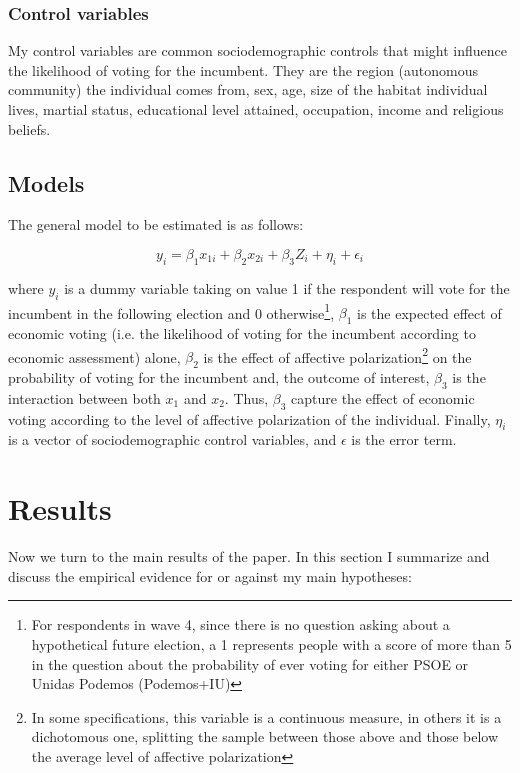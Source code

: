 \documentclass[a4paper, svgnames]{article}
\begin{document}
\subsubsection{Control variables}
My control variables are common sociodemographic controls that might influence the likelihood of voting for the incumbent. They are the region (autonomous community) the individual comes from, sex, age, size of the habitat individual lives, martial status, educational level attained, occupation, income and religious beliefs.

\subsection{Models}

The general model to be estimated is as follows:

\begin{equation}
	\label{model}
	y_i = \beta_1 x_{1i} + \beta_2 x_{2i} + \beta_3 Z_i  + \eta_i  + \epsilon_i
\end{equation}

where $y_i$ is a dummy variable taking on value 1 if the respondent will vote for the incumbent in the following election and 0 otherwise\footnote{For respondents in wave 4, since there is no question asking about a hypothetical future election, a 1 represents people with a score of more than 5 in the question about the probability of ever voting for either PSOE or Unidas Podemos (Podemos+IU)}, $\beta_1$ is the expected effect of economic voting (i.e. the likelihood of voting for the incumbent according to economic assessment) alone, $\beta_2$ is the effect of affective polarization\footnote{In some specifications, this variable is a continuous measure, in others it is a dichotomous one, splitting the sample between those above and those below the average level of affective polarization} on the probability of voting for the incumbent and, the outcome of interest, $\beta_3$ is the interaction between both $x_1$ and $x_2$. Thus, $\beta_3$ capture the effect of economic voting according to the level of affective polarization of the individual. Finally, $\eta_i$ is a vector of sociodemographic control variables, and $\epsilon$ is the error term.


\section{Results}

Now we turn to the main results of the paper. In this section I summarize and discuss the empirical evidence for or against my main hypotheses:
\end{document}
